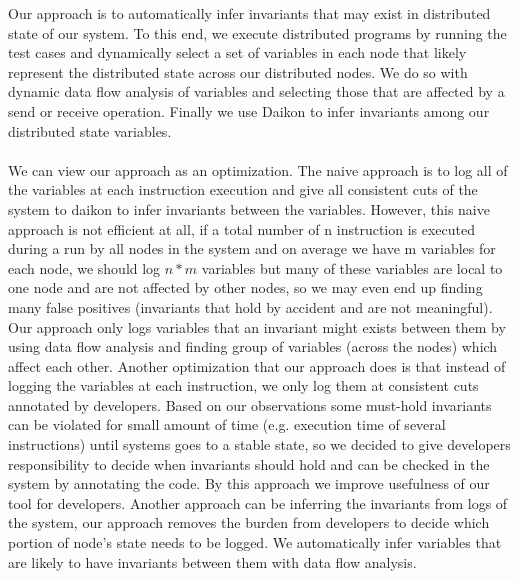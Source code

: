 Our approach is to automatically infer invariants that may exist in distributed state of our system. To this end, we execute distributed programs by running the test cases and dynamically select a set of variables in each node that likely represent the distributed state 
across our distributed nodes. We do so with dynamic data flow analysis of variables and selecting those that are affected by a send or receive operation. Finally we use Daikon to infer invariants among our distributed state variables. \\ \\
We can view our approach as an optimization. The naive approach is to log all of the variables at each instruction execution and give all consistent cuts of the system to daikon to infer invariants between the variables. However, this naive approach is not efficient at all, if a total number of n instruction is executed during a run by all nodes in the system and on average we have m variables for each node, we should log $n*m$ variables but many of these variables are local to one node and are not affected by other nodes, so we may even end up finding many false positives (invariants that hold by accident and are not meaningful). Our approach only logs variables that an invariant might exists between them by using data flow analysis and finding group of variables (across the nodes) which affect each other. 
Another optimization that our approach does is that instead of logging the variables at each instruction, we only log them at consistent cuts annotated by developers. Based on our observations some must-hold invariants can be violated for small amount of time (e.g. execution time of several instructions) until systems goes to a stable state, so we decided to give developers responsibility to decide when invariants should hold and can be checked in the system by annotating the code. By this approach we improve usefulness of our tool for developers. Another approach can be inferring the invariants from logs of the system, our approach removes the burden from developers to decide which portion of node's state needs to be logged. We automatically infer variables that are likely to have invariants between them with data flow analysis.